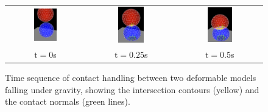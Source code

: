 \begin{figure}[ht]
\begin{center}
        \begin{tabular}{ccc}
        \includegraphics[width=0.31\textwidth]{images/femCollide1} &
        \includegraphics[width=0.31\textwidth]{images/femCollide2} &
        \includegraphics[width=0.31\textwidth]{images/femCollide3}\\
         \large  $\mathrm{t}=0$s & \large $\mathrm{t}=0.25$s & \large $\mathrm{t}=0.5$s         
        \end{tabular}
\end{center}
\caption{Time sequence of contact handling between two deformable models 
falling under gravity, 
showing the intersection contours
(yellow) and the contact normals (green lines).}
\label{Collision:fig}
\end{figure}

